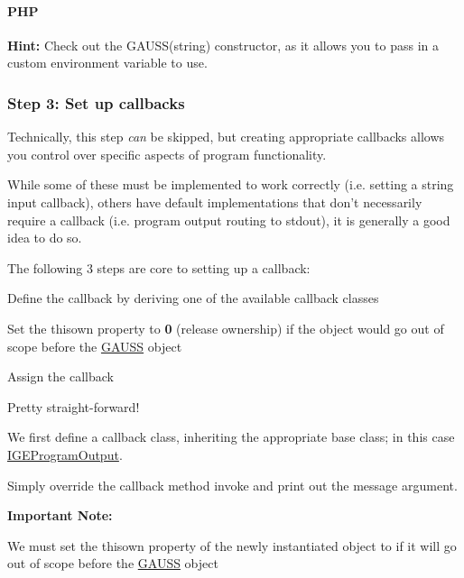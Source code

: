  \paragraph*{P\-H\-P}




{\bfseries Hint\-:} Check out the {\ttfamily G\-A\-U\-S\-S(string)} constructor, as it allows you to pass in a custom environment variable to use.

\subsubsection*{Step 3\-: Set up callbacks}

Technically, this step {\itshape can} be skipped, but creating appropriate callbacks allows you control over specific aspects of program functionality.

While some of these must be implemented to work correctly (i.\-e. setting a string input callback), others have default implementations that don't necessarily require a callback (i.\-e. program output routing to {\ttfamily stdout}), it is generally a good idea to do so.

The following 3 steps are core to setting up a callback\-:
\begin{DoxyEnumerate}
\item Define the callback by deriving one of the available callback classes
\item Set the {\ttfamily thisown} property to {\bfseries 0} (release ownership) if the object would go out of scope before the {\ttfamily \hyperlink{class_g_a_u_s_s}{G\-A\-U\-S\-S}} object
\item Assign the callback
\end{DoxyEnumerate}

Pretty straight-\/forward!

We first define a callback class, inheriting the appropriate base class; in this case \hyperlink{class_i_g_e_program_output}{I\-G\-E\-Program\-Output}.

Simply override the callback method {\ttfamily invoke} and print out the {\ttfamily message} argument.

{\bfseries Important Note\-:}

We must set the {\ttfamily thisown} property of the newly instantiated object to {} if it will go out of scope before the {\ttfamily \hyperlink{class_g_a_u_s_s}{G\-A\-U\-S\-S}} object

